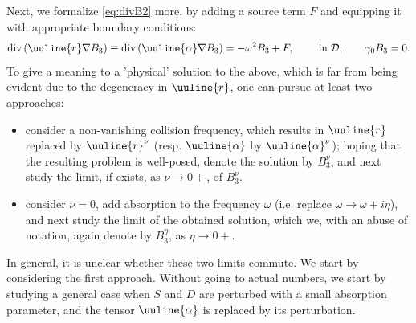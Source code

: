 \documentclass[report]{elsarticle}
\numberwithin{theorem}{section}
\begin{document}
Next, we formalize \eqref{eq:divB2} more, by adding a source term $F$ and equipping it with appropriate boundary conditions: 
\begin{align}
		\label{eq:divB32}
		\operatorname{div}\left(\uuline{r}\nabla B_3\right)\equiv \operatorname{div}\left(\uuline{\alpha}\nabla B_3\right)=-\omega^2 B_3+F,\qquad \text{ in }\mathcal{D},\qquad 
		\gamma_0 B_3=0.
\end{align}
To give a meaning to a 'physical' solution to the above, which is far from being evident due to the degeneracy in $\uuline{r}$, one can pursue at least two approaches: 
\begin{itemize}
	\item  consider a non-vanishing collision frequency, which results in $\uuline{r}$ replaced by $\uuline{r}^{\nu}$ (resp. $\uuline{\alpha}$ by $\uuline{\alpha}^{\nu}$); hoping that the resulting problem is well-posed, denote the solution by $B_3^{\nu}$,  and next study the limit, if exists, as $\nu\rightarrow 0+$, of $B_3^{\nu}$. 
	\item consider $\nu=0$, add absorption to the frequency $\omega$ (i.e. replace $\omega\rightarrow \omega+i\eta$), and next study the limit of the obtained solution, which we, with an abuse of notation, again denote by $B_3^{\eta}$, as  $\eta\rightarrow 0+$. 
\end{itemize}
In general, it is unclear whether these two limits commute. We start by considering the first approach. Without going to actual numbers, we start by studying a general case when $S$ and $D$ are perturbed with a small absorption parameter, and the  tensor $\uuline{\alpha}$ is replaced by its perturbation.
\end{document}
